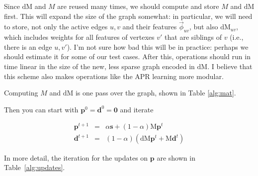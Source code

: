 \documentclass[12pt]{article}
\newcommand{\vek}[1]{\textbf{#1}}
\newcommand{\M}{\textrm{M}}
\newcommand{\dM}{\textrm{dM}}
\newcommand{\vphi}{\vec{\phi}}
\begin{document}
Since $\dM$ and $M$ are reused many times, we should compute and store
$M$ and $\dM$ first.  This will expand the size of the graph somewhat:
in particular, we will need to store, not only the active edges $u,v$
and their features $\vphi_{uv}$, but also $\dM_{uv}$, which includes
weights for all features of vertexes $v'$ that are siblings of $v$
(i.e., there is an edge $u,v'$).  I'm not sure how bad this will be in
practice: perhaps we should estimate it for some of our test cases.
After this, operations should run in time linear in the size of the
new, less sparse graph encoded in $\dM$.  I believe that this scheme
also makes operations like the APR learning more modular.

Computing $M$ and $\dM$ is one pass over the graph, shown in Table
\ref{alg:mat}.


Then you can start with $\vek{p}^0 = \vek{d}^0 = \vek{0}$ and iterate

\begin{eqnarray}
\vek{p}^{t+1}  & =  & \alpha \vek{s} + (1-\alpha) \M \vek{p}^t \\
\vek{d}^{t+1}  & =  & (1-\alpha) \left( \dM \vek{p}^t  + \M \vek{d}^t \right)
\end{eqnarray}

In more detail, the iteration for the updates on $\vek{p}$ are shown
in Table~\ref{alg:updates}.
\end{document}
